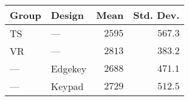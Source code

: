 \begin{tabular}{llrr}
\toprule
Group &   Design &   Mean &  Std. Dev. \\
\midrule
   TS &      --- & $2595$ &    $567.3$ \\
   VR &      --- & $2813$ &    $383.2$ \\
  --- &  Edgekey & $2688$ &    $471.1$ \\
  --- &   Keypad & $2729$ &    $512.5$ \\
\bottomrule
\end{tabular}
